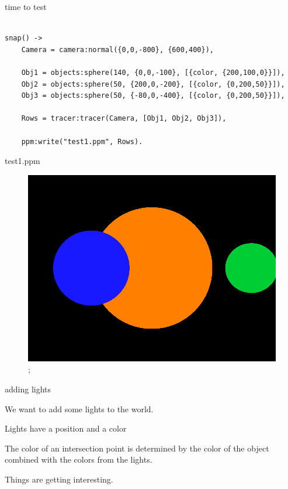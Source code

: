 \begin{frame}[fragile]{time to test}
\begin{verbatim}

snap() ->
    Camera = camera:normal({0,0,-800}, {600,400}),

    Obj1 = objects:sphere(140, {0,0,-100}, [{color, {200,100,0}}]),
    Obj2 = objects:sphere(50, {200,0,-200}, [{color, {0,200,50}}]),
    Obj3 = objects:sphere(50, {-80,0,-400}, [{color, {0,200,50}}]),

    Rows = tracer:tracer(Camera, [Obj1, Obj2, Obj3]),

    ppm:write("test1.ppm", Rows).
\end{verbatim}
\end{frame}

\begin{frame}{test1.ppm}

\begin{figure}
\includegraphics[scale=0.3]{test1.png};
\end{figure}

\end{frame}



\begin{frame}{adding lights}

\pause We want to add some lights to the world.

\pause 
\vspace{10pt}Lights have a position and a color

\pause 
\vspace{10pt}The color of an intersection point is determined by the color of the object combined with the colors from the lights. 

\pause 
\vspace{10pt}Things are getting interesting.

\end{frame}


